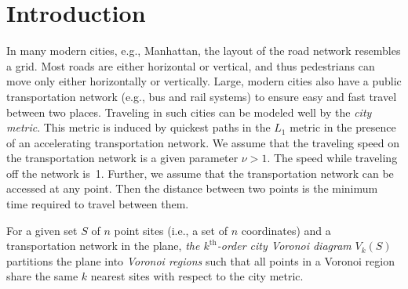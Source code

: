 \documentclass[11pt]{llncs}
\newcommand{\kth}{\ensuremath{k^{\mathrm{th}}}\xspace}
\newcommand{\kthorder}{\kth-order\xspace}
\newcommand{\deleted}[1]{}
\begin{document}
\begin{abstract}
\deleted{
We address $k$ nearest neighbor problems in the presence of transportation networks on the $L_1$ plane, which is commonly referred to as city metric.
More specifically, we investigate the higher-order city Voronoi diagrams
to derive the complexities and develop algorithms.
For the structural complexity of \kthorder city Voronoi diagrams
we show a lower bound of $\Omega(n+kc)$ and an upper bound of $O(k(n-k)+kc)$, where $c$ is the complexity of the transportation network.
This is quite different from the bound $O(k(n-k))$ in the Euclidean metric \cite{Lee-82}.
In particular, for $k=n-1$, the complexity in the Euclidean metric is $O(n)$,
while that in the city metric is $\Theta(nc)$.
Furthermore, we develop an iterative algorithm to compute the $k^{\mathrm{th}}$-order city Voronoi diagram
in $O(k^2(n+c)\log n)$ time
and a divide-and-conquer algorithm to compute the farthest-site city Voronoi diagram in $O(nc\log^2(n+c)\log n)$ time.
Our complexity results further indicates that the impact of the transportation network is not a constant
but increases with the value of $k$, and the underlying distance metric will affect the structural complexity of higher-order Voronoi diagram a lot. }

\end{abstract}



\section{Introduction}

In many modern cities, e.g., Manhattan, the layout of the road network resembles a grid.
Most roads are either horizontal or vertical, and thus pedestrians can move only either horizontally or vertically.
Large, modern cities also have a public transportation network (e.g., bus and rail systems)
to ensure easy and fast travel between two places.
Traveling in such cities can be modeled well by the \emph{city metric}.
This metric is induced by quickest paths in the $L_1$ metric in the presence of an accelerating transportation network.
We assume that the traveling speed on the transportation network is a given parameter $\nu > 1$.
The speed while traveling off the network is~1.
Further, we assume that the transportation network can be accessed at any point.
Then
the distance between two points is the minimum time required to travel between them.

For a given set $S$ of $n$ point sites (i.e., a set of $n$ coordinates) and a transportation network in the plane,
\emph{the $k^{\mathrm{th}}$-order city Voronoi diagram} $V_k(S)$
partitions the plane into \emph{Voronoi regions}
such that all points in a Voronoi region share the same $k$ nearest sites
with respect to the city metric.
\end{document}
